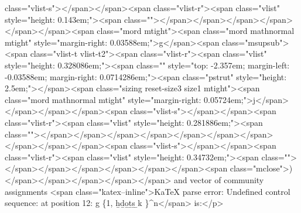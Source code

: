 class="vlist-s">​</span></span><span class="vlist-r"><span class="vlist" style="height: 0.143em;"><span class=""></span></span></span></span></span></span><span class="mord mtight"><span class="mord mathnormal mtight" style="margin-right: 0.03588em;">g</span><span class="msupsub"><span class="vlist-t vlist-t2"><span class="vlist-r"><span class="vlist" style="height: 0.328086em;"><span class="" style="top: -2.357em; margin-left: -0.03588em; margin-right: 0.0714286em;"><span class="pstrut" style="height: 2.5em;"></span><span class="sizing reset-size3 size1 mtight"><span class="mord mathnormal mtight" style="margin-right: 0.05724em;">j</span></span></span></span><span class="vlist-s">​</span></span><span class="vlist-r"><span class="vlist" style="height: 0.281886em;"><span class=""></span></span></span></span></span></span></span></span></span></span><span class="vlist-s">​</span></span><span class="vlist-r"><span class="vlist" style="height: 0.34732em;"><span class=""></span></span></span></span></span></span><span class="mclose">)</span></span></span></span></span> and vector of community assignments <span class="katex--inline">KaTeX parse error: Undefined control sequence: \hdots at position 12: g \in \{1, \̲h̲d̲o̲t̲s̲ ̲k \}^n</span> is:</p>
